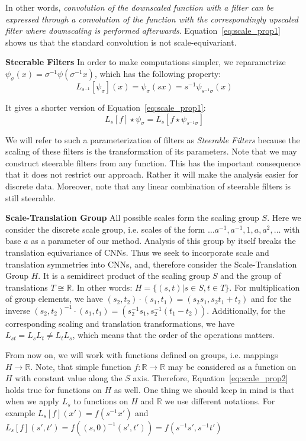 \documentclass{article} \usepackage{multirow}
\def\Eqref#1{Equation~\ref{#1}}
\begin{document}
In other words, \textit{convolution of the downscaled function with a filter can 
be expressed through a convolution of the function 
with the correspondingly 
upscaled filter where downscaling is performed afterwards}.
\Eqref{eq:scale_prop1} shows us that the standard convolution is not scale-equivariant.

\textbf{Steerable Filters}
In order to make computations simpler, we reparametrize 
$\psi_\sigma(x) = \sigma^{-1} \psi(\sigma^{-1} x)$, which has the following property:
\begin{equation}
    \label{eq:steerable_filter}
    L_{s^{-1}}[\psi_\sigma](x) = \psi_{\sigma}(s x) = s^{-1} \psi_{s^{-1}\sigma}(x)
\end{equation}

It gives a shorter version of \Eqref{eq:scale_prop1}:
\begin{equation}
    \label{eq:scale_prop2}
    L_s[f] \star \psi_\sigma = L_s[f \star \psi_{s^{-1}\sigma}] 
\end{equation}

We will refer to such a parameterization of filters as \textit{Steerable Filters} because
the scaling of these filters is the transformation of its parameters. Note that 
we may construct steerable filters from any function. This has the important consequence 
that it does not restrict our approach. Rather it will make 
the analysis easier for discrete data.
Moreover, note that any linear combination of steerable filters is still steerable.


\textbf{Scale-Translation Group}
All possible scales form the scaling group $S$. Here we consider the discrete scale group, i.e.
scales of the form $\dots a^{-1}, a^{-1}, 1, a, a^2, \dots$ with base $a$ as a parameter of our method.
Analysis of this group by itself breaks the translation equivariance of CNNs. 
Thus we seek to incorporate scale and translation symmetries into CNNs, 
and, therefore consider the Scale-Translation Group $H$. It is a semidirect product
of the scaling group $S$ and the group of translations $T \cong \mathbb{R}$. In other words:
$H = \{ (s, t) | s \in S, t \in T \}$. 
For multiplication of group elements, we have
$(s_2, t_2) \cdot (s_1, t_1) = (s_2 s_1, s_2 t_1 + t_2)$ and for the inverse 
$(s_2, t_2)^{-1} \cdot (s_1, t_1) = (s_2^{-1} s_1, s_2^{-1} (t_1 - t_2))$. 
Additionally, for the corresponding scaling and translation transformations, we have
$L_{st} = L_s L_t \neq L_t L_s $,
which means that the order of the operations matters.

From now on, we will work with functions defined on groups, i.e. mappings $H \rightarrow \mathbb{R}$.
Note, that simple function $f: \mathbb{R}\rightarrow \mathbb{R}$ may be considered as  
a function on $H$ with constant value along the $S$ axis. Therefore, \Eqref{eq:scale_prop2} holds true 
for functions on $H$ as well. One thing we should keep in mind is that when we apply $L_s$ 
to functions on $H$ and $\mathbb{R}$ we use different notations. For example
$L_s[f](x') = f(s^{-1}x')$ and 
$L_s[f](s', t')=f((s, 0)^{-1}(s', t'))=f(s^{-1}s', s^{-1}t')$
\end{document}
